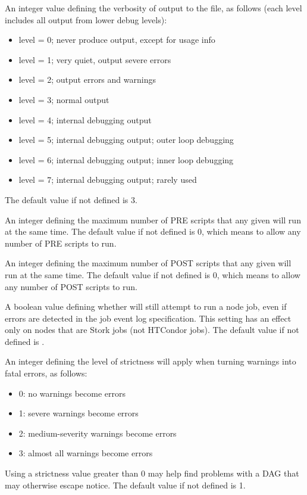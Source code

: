 \begin{description}
\label{param:DAGManVerbosity}
\item[\Macro{DAGMAN\_VERBOSITY}]
  An integer value defining the verbosity of output to the
   file, as follows (each level includes all output
  from lower debug levels):
  \begin{itemize}
    \item level = 0; never produce output,
          except for usage info
    \item level = 1; very quiet, output severe errors
    \item level = 2; output errors and warnings
    \item level = 3; normal output
    \item level = 4; internal debugging output
    \item level = 5; internal debugging output; outer loop debugging
    \item level = 6; internal debugging output; inner loop debugging
    \item level = 7; internal debugging output; rarely used
  \end{itemize}
  The default value if not defined is 3.

\label{param:DAGManMaxPreScripts}
\item[\Macro{DAGMAN\_MAX\_PRE\_SCRIPTS}]
  An integer defining the maximum number of PRE scripts that any given
   will run at the same time.  The default value if not
  defined is 0, which means to allow any number of PRE scripts to run.

\label{param:DAGManMaxPostScripts}
\item[\Macro{DAGMAN\_MAX\_POST\_SCRIPTS}]
  An integer defining the maximum number of POST scripts that any given
   will run at the same time.  The default value if not
  defined is 0, which means to allow any number of POST scripts to run.

\label{param:DAGManAllowLogError}
\item[\Macro{DAGMAN\_ALLOW\_LOG\_ERROR}]
  A boolean value defining whether  will still attempt
  to run a node job, even if errors are detected in the job event log
  specification.  This setting has an effect only on nodes that are
  Stork jobs (not HTCondor jobs).  The default value if not defined is
  .

\label{param:DAGManUseStrict}
\item[\Macro{DAGMAN\_USE\_STRICT}]
  An integer defining the level of strictness  will apply
  when turning warnings into fatal errors, as follows:
  \begin{itemize}
    \item 0: no warnings become errors
    \item 1: severe warnings become errors
    \item 2: medium-severity warnings become errors
    \item 3: almost all warnings become errors
  \end{itemize}
  Using a strictness value greater than 0 may help find problems with
  a DAG that may otherwise escape notice.
  The default value if not defined is 1.


\end{description}
